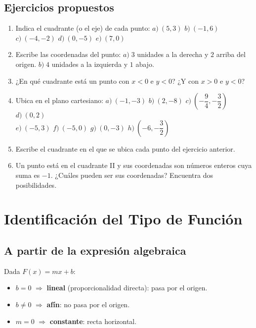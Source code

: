 \documentclass[12pt, letterpaper]{article}
\begin{document}
\subsection{Ejercicios propuestos}

\begin{enumerate}[leftmargin=*, resume]
  \item \facil{} Indica el cuadrante (o el eje) de cada punto: $a)\ (5, 3)$ \quad $b)\ (-1, 6)$ \quad $c)\ (-4, -2)$ \quad $d)\ (0, -5)$ \quad $e)\ (7, 0)$

  \item \facil{} Escribe las coordenadas del punto: $a) \; 3$ unidades a la derecha y $2$ arriba del origen. $b) \; 4$ unidades a la izquierda y $1$ abajo.

  \item \facil{} ¿En qué cuadrante está un punto con $x < 0$ e $y < 0$? ¿Y con $x > 0$ e $y < 0$?

  \item \medio{} Ubica en el plano cartesiano: $a)\ (-1, -3)$ \quad $b)\ (2, -8)$ \quad $c)\ \left(-\dfrac{9}{4}, -\dfrac{3}{2}\right)$ \quad $d)\ (0, 2)$ \\
        $e)\ (-5, 3)$ \quad $f)\ (-5, 0)$ \quad $g)\ (0, -3)$ \quad $h)\ \left(-6, -\dfrac{3}{2}\right)$

  \item \medio{} Escribe el cuadrante en el que se ubica cada punto del ejercicio anterior.

  \item \dificil{} Un punto está en el cuadrante II y sus coordenadas son números enteros cuya suma es $-1$. ¿Cuáles pueden ser sus coordenadas? Encuentra dos posibilidades.
\end{enumerate}

\newpage

\section{Identificación del Tipo de Función}

\subsection{A partir de la expresión algebraica}

\begin{cuadroteoria}
  Dada $F(x) = mx + b$:
  \begin{itemize}[leftmargin=*]
    \item $b = 0$ $\Rightarrow$ \textbf{lineal} (proporcionalidad directa): pasa por el origen.
    \item $b \neq 0$ $\Rightarrow$ \textbf{afín}: no pasa por el origen.
    \item $m = 0$ $\Rightarrow$ \textbf{constante}: recta horizontal.
  \end{itemize}
\end{cuadroteoria}
\end{document}
